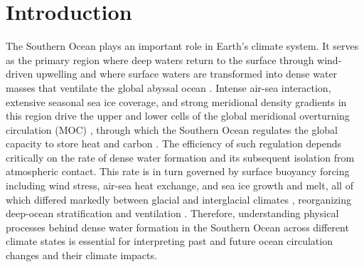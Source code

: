 \documentclass[pdflatex,sn-nature]{sn-jnl}
\begin{document}

\maketitle

\section{Introduction}


The Southern Ocean plays an important role in Earth's climate system. It serves as the primary region where deep waters return to the surface through wind-driven upwelling and where surface waters are transformed into dense water masses that ventilate the global abyssal ocean \cite{Marshall2012,Talley2013}. Intense air-sea interaction, extensive seasonal sea ice coverage, and strong meridional density gradients in this region drive the upper and lower cells of the global meridional overturning circulation (MOC) \cite{Speer2000,Lumpkin2007}, through which the Southern Ocean regulates the global capacity to store heat and carbon \cite{Marinov2006,Gray2024}. The efficiency of such regulation depends critically on the rate of dense water formation and its subsequent isolation from atmospheric contact.  This rate is in turn governed by surface buoyancy forcing including wind stress, air-sea heat exchange, and sea ice growth and melt, all of which differed markedly between glacial and interglacial climates \cite{sime2013southern,chadwick2022compilation}, reorganizing deep-ocean stratification and ventilation \cite{volker2013responses,Ferrari2014,mandal2021roles}. Therefore, understanding physical processes behind dense water formation in the Southern Ocean across different climate states is essential for interpreting past and future ocean circulation changes and their climate impacts.

\end{document}
